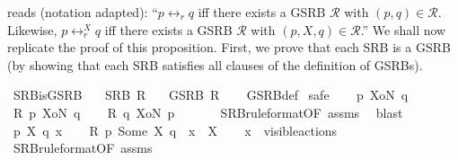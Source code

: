 \begin{isabellebody}
\isanewline
%
\isadelimunimportant
%
\endisadelimunimportant
%
\isatagunimportant
%
\endisatagunimportant
{\isafoldunimportant}%
%
\isadelimunimportant
%
\endisadelimunimportant
%
\isadelimdocument
%
\endisadelimdocument
%
\isatagdocument
%
\isamarkuptrue%
%
\endisatagdocument
{\isafolddocument}%
%
\isadelimdocument
%
\endisadelimdocument
%
\begin{isamarkuptext}%
\cite[proposition 4]{rbs} reads (notation adapted): \enquote{$p \leftrightarrow_r q$ iff there exists a GSRB $\mathcal{R}$ with $(p,q) \in \mathcal{R}$. Likewise, $p \leftrightarrow_r^X q$ iff there exists a GSRB $\mathcal{R}$ with $(p,X,q) \in \mathcal{R}$.} We shall now replicate the proof of this proposition. First, we prove that each SRB is a GSRB (by showing that each SRB satisfies all clauses of the definition of GSRBs).%
\end{isamarkuptext}\isamarkuptrue%
\isamarkupfalse%
\ SRB{\isacharunderscore}{\kern0pt}is{\isacharunderscore}{\kern0pt}GSRB{\isacharcolon}{\kern0pt}\isanewline
\ \ \ {\isacartoucheopen}SRB\ R{\isacartoucheclose}\isanewline
\ \ \ {\isacartoucheopen}GSRB\ R{\isacartoucheclose}\isanewline
%
\isadelimproof
\ \ %
\endisadelimproof
%
\isatagproof
{}\isamarkupfalse%
\ GSRB{\isacharunderscore}{\kern0pt}def\isanewline
{}\isamarkupfalse%
\ {\isacharparenleft}{\kern0pt}safe{\isacharparenright}{\kern0pt}\isanewline
\ \ \isamarkupfalse%
\ p\ XoN\ q\isanewline
\ \ \isamarkupfalse%
\ {\isacartoucheopen}R\ p\ XoN\ q{\isacartoucheclose}\isanewline
\ \ \isamarkupfalse%
\ {\isacartoucheopen}R\ q\ XoN\ p{\isacartoucheclose}\ \isanewline
\ \ \ \ \isamarkupfalse%
\ SRB{\isacharunderscore}{\kern0pt}ruleformat{\isacharbrackleft}{\kern0pt}OF\ assms{\isacharbrackright}{\kern0pt}\ \isamarkupfalse%
\ blast\isanewline
{}\isamarkupfalse%
\isanewline
\ \ \isamarkupfalse%
\ p\ X\ q\ x\isanewline
\ \ \isamarkupfalse%
\ {\isacartoucheopen}R\ p\ {\isacharparenleft}{\kern0pt}Some\ X{\isacharparenright}{\kern0pt}\ q{\isacartoucheclose}\ \ {\isacartoucheopen}x\ {\isasymin}\ X{\isacartoucheclose}\isanewline
\ \ \isamarkupfalse%
\ {\isacartoucheopen}x\ {\isasymin}\ visible{\isacharunderscore}{\kern0pt}actions{\isacartoucheclose}\ \isanewline
\ \ \ \ \isamarkupfalse%
\ SRB{\isacharunderscore}{\kern0pt}ruleformat{\isacharbrackleft}{\kern0pt}OF\ assms{\isacharbrackright}{\kern0pt}\ \isamarkupfalse%

\end{isabellebody}
